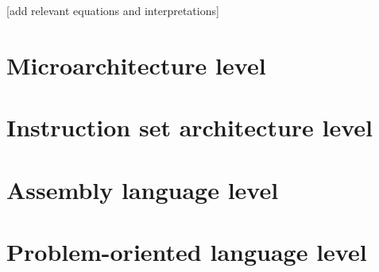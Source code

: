\documentclass{article}
\begin{document}
[add relevant equations and interpretations]

\section{Microarchitecture level}

\section{Instruction set architecture level}

\section{Assembly language level}

\section{Problem-oriented language level}
\end{document}
